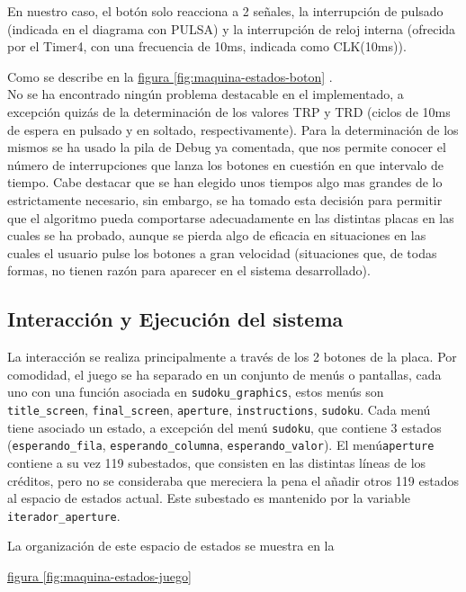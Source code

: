 \documentclass[12pt,letterpaper]{article}
\newcommand*{\iref}[2]{
  \hyperref[#1]{#2
  \ref*{#1}}
  }
\begin{document}
En nuestro caso, el botón solo reacciona a 2 señales, la interrupción
de pulsado (indicada en el diagrama con PULSA) y la interrupción de
reloj interna (ofrecida por el Timer4, con una frecuencia de 10ms,
indicada como CLK(10ms)).

Como se describe en la \iref{fig:maquina-estados-boton}{figura}.\\ No
se ha encontrado ningún problema destacable en el implementado, a
excepción quizás de la determinación de los valores TRP y TRD (ciclos
de 10ms de espera en pulsado y en soltado, respectivamente). Para la
determinación de los mismos se ha usado la pila de Debug ya comentada,
que nos permite conocer el número de interrupciones que lanza los
botones en cuestión en que intervalo de tiempo. Cabe destacar que se
han elegido unos tiempos algo mas grandes de lo estrictamente
necesario, sin embargo, se ha tomado esta decisión para permitir que
el algoritmo pueda comportarse adecuadamente en las distintas placas
en las cuales se ha probado, aunque se pierda algo de eficacia en
situaciones en las cuales el usuario pulse los botones a gran
velocidad (situaciones que, de todas formas, no tienen razón para
aparecer en el sistema desarrollado).

\subsection{Interacción y Ejecución del sistema}
\label{subsec:interaction-ejecucion}
La interacción se realiza principalmente a través de los 2 botones de
la placa. Por comodidad, el juego se ha separado en un conjunto de
menús o pantallas, cada uno con una función asociada en
\texttt{sudoku\_graphics}, estos menús son \texttt{title\_screen},
\texttt{final\_screen}, \texttt{aperture}, \texttt{instructions},
\texttt{sudoku}. Cada menú tiene asociado un estado, a excepción del
menú \texttt{sudoku}, que contiene 3 estados
(\texttt{esperando\_fila}, \texttt{esperando\_columna},
\texttt{esperando\_valor}). El menú\newline\texttt{aperture} contiene a su
vez 119 subestados, que consisten en las distintas líneas de los
créditos, pero no se consideraba que mereciera la pena el añadir otros
119 estados al espacio de estados actual. Este subestado es mantenido
por la variable \texttt{iterador\_aperture}.

La organización de este espacio de estados se muestra en la
\iref{fig:maquina-estados-juego}{figura}
\end{document}
